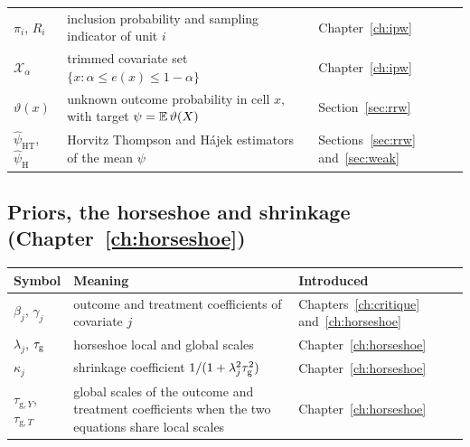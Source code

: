 {\noindent\small\centering
\setlength{\tabcolsep}{4pt}\renewcommand{\arraystretch}{1.1}
\begin{tabular}{>{\raggedright\arraybackslash}p{1.0in}>{\raggedright\arraybackslash}p{2.15in}>{\raggedright\arraybackslash}p{0.95in}}
$\pi_i$, $R_i$ & inclusion probability and sampling indicator of unit $i$ & Chapter~\ref{ch:ipw} \\
$\mathcal{X}_\alpha$ & trimmed covariate set $\{x : \alpha \le e(x) \le 1 - \alpha\}$ & Chapter~\ref{ch:ipw} \\
$\vartheta(x)$ & unknown outcome probability in cell $x$, with target $\psi = \mathbb{E}\,\vartheta(X)$ & Section~\ref{sec:rrw} \\
$\hat\psi_{\mathrm{HT}}$, $\hat\psi_{\mathrm{H}}$ & Horvitz Thompson and H\'ajek estimators of the mean $\psi$ & Sections~\ref{sec:rrw} and~\ref{sec:weak} \\
\bottomrule
\end{tabular}\par}

\subsection*{Priors, the horseshoe and shrinkage (Chapter~\ref{ch:horseshoe})}

{\noindent\small\centering
\setlength{\tabcolsep}{4pt}\renewcommand{\arraystretch}{1.1}
\begin{tabular}{>{\raggedright\arraybackslash}p{1.0in}>{\raggedright\arraybackslash}p{2.15in}>{\raggedright\arraybackslash}p{0.95in}}
\toprule
Symbol & Meaning & Introduced \\
\midrule
$\beta_j$, $\gamma_j$ & outcome and treatment coefficients of covariate $j$ & Chapters~\ref{ch:critique} and~\ref{ch:horseshoe} \\
$\lambda_j$, $\tau_{\mathrm{g}}$ & horseshoe local and global scales & Chapter~\ref{ch:horseshoe} \\
$\kappa_j$ & shrinkage coefficient $1/(1 + \lambda_j^2\tau_{\mathrm{g}}^2)$ & Chapter~\ref{ch:horseshoe} \\
$\tau_{\mathrm{g},Y}$, $\tau_{\mathrm{g},T}$ & global scales of the outcome and treatment coefficients when the two equations share local scales & Chapter~\ref{ch:horseshoe} \\
\end{tabular}\par}

